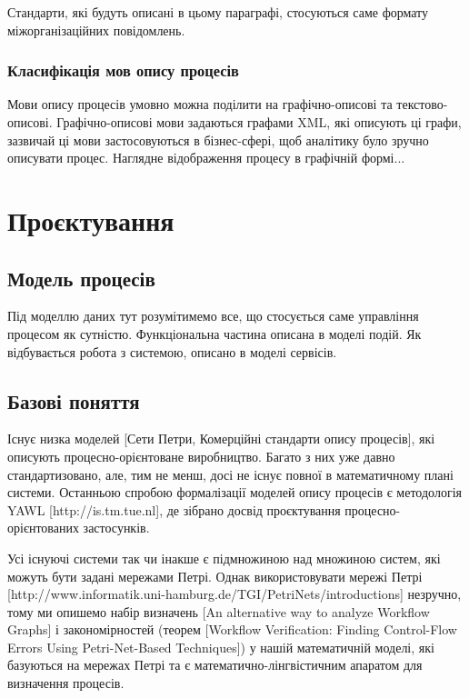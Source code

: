 \documentclass{memoir}
\begin{document}
Стандарти, які будуть описані в цьому параграфі, стосуються саме формату міжорганізаційних повідомлень.

\subsection{Класифікація мов опису процесів}

Мови опису процесів умовно можна поділити на графічно-описові та текстово-описові. Графічно-описові мови задаються графами XML, які описують ці графи, зазвичай ці мови застосовуються в бізнес-сфері, щоб аналітику було зручно описувати процес. Наглядне відображення процесу в графічній формі...

\chapter{Проєктування}

\section{Модель процесів}

Під моделлю даних тут розумітимемо все, що стосується саме управління процесом як сутністю. Функціональна частина описана в моделі подій. Як відбувається робота з системою, описано в моделі сервісів.

\section{Базові поняття}

Існує низка моделей [Сети Петри, Комерційні стандарти опису процесів], які описують процесно-орієнтоване виробництво. Багато з них уже давно стандартизовано, але, тим не менш, досі не існує повної в математичному плані системи. Останньою спробою формалізації моделей опису процесів є методологія YAWL [http://is.tm.tue.nl], де зібрано досвід проєктування процесно-орієнтованих застосунків.

Усі існуючі системи так чи інакше є підмножиною над множиною систем, які можуть бути задані мережами Петрі. Однак використовувати мережі Петрі [http://www.informatik.uni-hamburg.de/TGI/PetriNets/introductions] незручно, тому ми опишемо набір визначень [An alternative way to analyze Workflow Graphs] і закономірностей (теорем [Workflow Verification: Finding Control-Flow Errors Using Petri-Net-Based Techniques]) у нашій математичній моделі, які базуються на мережах Петрі та є математично-лінгвістичним апаратом для визначення процесів.
\end{document}
